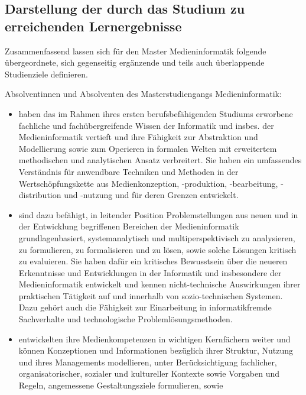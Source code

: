 \subsection{Darstellung der durch das Studium zu erreichenden
Lernergebnisse
\label{/mi-2017/selbstbericht/0200-qualifikationsziele/0000-qualifikationsziele}}\label{darstellung-der-durch-das-studium-zu-erreichenden-lernergebnisse-pathlabelmi-2017selbstbericht0200-qualifikationsziele0000-qualifikationsziele}

Zusammenfassend lassen sich für den Master Medieninformatik folgende
übergeordnete, sich gegenseitig ergänzende und teils auch überlappende
Studienziele definieren.

Absolventinnen und Absolventen des Masterstudiengangs Medieninformatik:

\begin{itemize}
\tightlist
\item
  haben das im Rahmen ihres ersten berufsbefähigenden Studiums erworbene
  fachliche und fachübergreifende Wissen der Informatik und insbes. der
  Medieninformatik vertieft und ihre Fähigkeit zur Abstraktion und
  Modellierung sowie zum Operieren in formalen Welten mit erweitertem
  methodischen und analytischen Ansatz verbreitert. Sie haben ein
  umfassendes Verständnis für anwendbare Techniken und Methoden in der
  Wertschöpfungskette aus Medienkonzeption, -produktion, -bearbeitung,
  -distribution und -nutzung und für deren Grenzen entwickelt.
\item
  sind dazu befähigt, in leitender Position Problemstellungen aus neuen
  und in der Entwicklung begriffenen Bereichen der Medieninformatik
  grundlagenbasiert, systemanalytisch und multiperspektivisch zu
  analysieren, zu formulieren, zu formalisieren und zu lösen, sowie
  solche Lösungen kritisch zu evaluieren. Sie haben dafür ein kritisches
  Bewusstsein über die neueren Erkenntnisse und Entwicklungen in der
  Informatik und insbesondere der Medieninformatik entwickelt und kennen
  nicht-technische Auswirkungen ihrer praktischen Tätigkeit auf und
  innerhalb von sozio-technischen Systemen. Dazu gehört auch die
  Fähigkeit zur Einarbeitung in informatikfremde Sachverhalte und
  technologische Problemlösungsmethoden.
\item
  entwickelten ihre Medienkompetenzen in wichtigen Kernfächern weiter
  und können Konzeptionen und Informationen bezüglich ihrer Struktur,
  Nutzung und ihres Managements modellieren, unter Berücksichtigung
  fachlicher, organisatorischer, sozialer und kultureller Kontexte sowie
  Vorgaben und Regeln, angemessene Gestaltungsziele formulieren, sowie

\end{itemize}
